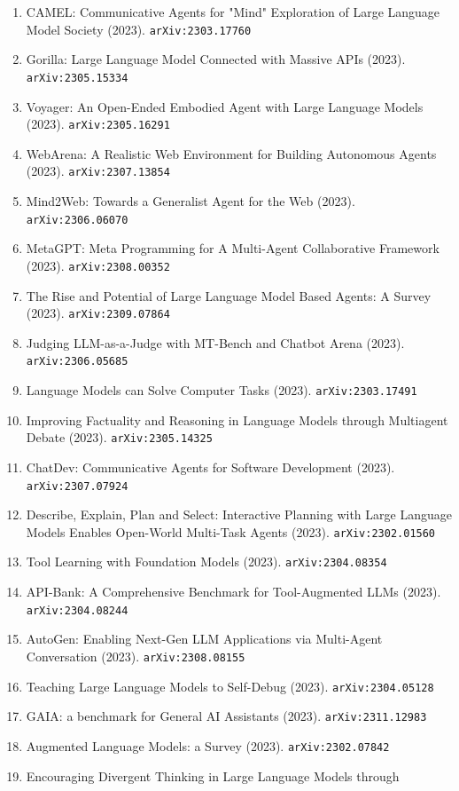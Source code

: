 \documentclass[11pt]{article}
\begin{document}
\begin{enumerate}
  \item CAMEL: Communicative Agents for "Mind" Exploration of Large Language
  Model Society (2023). \texttt{arXiv:2303.17760}
  \item Gorilla: Large Language Model Connected with Massive APIs (2023). \texttt{arXiv:2305.15334}
  \item Voyager: An Open-Ended Embodied Agent with Large Language Models (2023). \texttt{arXiv:2305.16291}
  \item WebArena: A Realistic Web Environment for Building Autonomous Agents (2023). \texttt{arXiv:2307.13854}
  \item Mind2Web: Towards a Generalist Agent for the Web (2023). \texttt{arXiv:2306.06070}
  \item MetaGPT: Meta Programming for A Multi-Agent Collaborative Framework (2023). \texttt{arXiv:2308.00352}
  \item The Rise and Potential of Large Language Model Based Agents: A Survey (2023). \texttt{arXiv:2309.07864}
  \item Judging LLM-as-a-Judge with MT-Bench and Chatbot Arena (2023). \texttt{arXiv:2306.05685}
  \item Language Models can Solve Computer Tasks (2023). \texttt{arXiv:2303.17491}
  \item Improving Factuality and Reasoning in Language Models through Multiagent
  Debate (2023). \texttt{arXiv:2305.14325}
  \item ChatDev: Communicative Agents for Software Development (2023). \texttt{arXiv:2307.07924}
  \item Describe, Explain, Plan and Select: Interactive Planning with Large
  Language Models Enables Open-World Multi-Task Agents (2023). \texttt{arXiv:2302.01560}
  \item Tool Learning with Foundation Models (2023). \texttt{arXiv:2304.08354}
  \item API-Bank: A Comprehensive Benchmark for Tool-Augmented LLMs (2023). \texttt{arXiv:2304.08244}
  \item AutoGen: Enabling Next-Gen LLM Applications via Multi-Agent Conversation (2023). \texttt{arXiv:2308.08155}
  \item Teaching Large Language Models to Self-Debug (2023). \texttt{arXiv:2304.05128}
  \item GAIA: a benchmark for General AI Assistants (2023). \texttt{arXiv:2311.12983}
  \item Augmented Language Models: a Survey (2023). \texttt{arXiv:2302.07842}
  \item Encouraging Divergent Thinking in Large Language Models through

\end{enumerate}
\end{document}
